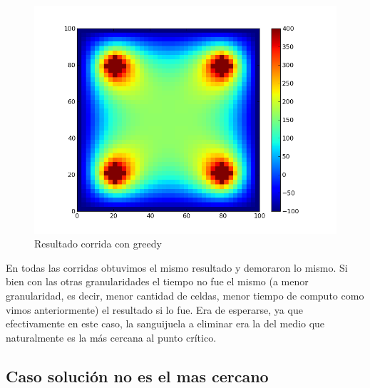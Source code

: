 \begin{figure}[htb]
\begin{center}
\includegraphics[scale=0.40]{imagenes/random_2.png} 
\caption{Resultado corrida con greedy} 
\end{center}
\end{figure}


En todas las corridas obtuvimos el mismo resultado y demoraron lo mismo. Si bien con las otras granularidades el tiempo no fue el mismo (a menor granularidad, es decir, menor cantidad de celdas,  menor tiempo de computo como vimos anteriormente) el resultado si lo fue. Era de esperarse, ya que efectivamente en este caso, la sanguijuela a eliminar era la del medio que naturalmente es la más cercana al punto crítico.
\newpage

\subsection{Caso solución no es el mas cercano}

